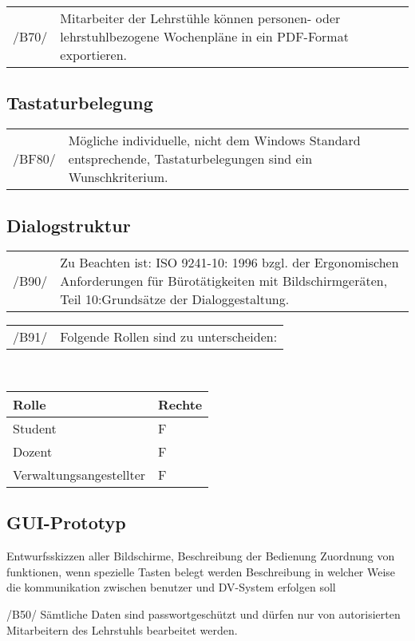 \begin{tabular}{p{1.5cm}p{14.5cm}}
 /B70/	& Mitarbeiter der Lehrstühle können personen- oder lehrstuhlbezogene Wochenpläne in ein PDF-Format exportieren. \\[0.25cm]	 
\end{tabular}
 
\subsection{Tastaturbelegung}

\begin{tabular}{p{1.5cm}p{14.5cm}}
 /BF80/	& Mögliche individuelle, nicht dem Windows Standard entsprechende, Tastaturbelegungen sind ein Wunschkriterium. \\[0.25cm]	 
\end{tabular}

\subsection{Dialogstruktur}

\begin{tabular}{p{1.5cm}p{14.5cm}}
 /B90/	& Zu Beachten ist: ISO 9241-10: 1996 bzgl. der Ergonomischen Anforderungen für Bürotätigkeiten mit Bildschirmgeräten, Teil 10:Grundsätze der Dialoggestaltung. \\[0.25cm]	 
\end{tabular}

\begin{tabular}{p{1.5cm}p{14.5cm}}
 /B91/	& Folgende Rollen sind zu unterscheiden: \\[0.25cm]	 
\end{tabular}\\

\begin{table}
\begin{tabular}{l|l}
Rolle&Rechte\\
\hline
\hline
Student & F \\
\hline
Dozent & F \\
\hline
Verwaltungsangestellter & F \\
\hline
\end{tabular}
\end{table}

\subsection{GUI-Prototyp}

Entwurfsskizzen aller Bildschirme, Beschreibung der Bedienung
Zuordnung von funktionen, wenn spezielle Tasten belegt werden
Beschreibung in welcher Weise die kommunikation zwischen benutzer und DV-System erfolgen soll

/B50/ Sämtliche Daten sind passwortgeschützt und dürfen nur 
von autorisierten Mitarbeitern des Lehrstuhls bearbeitet werden.